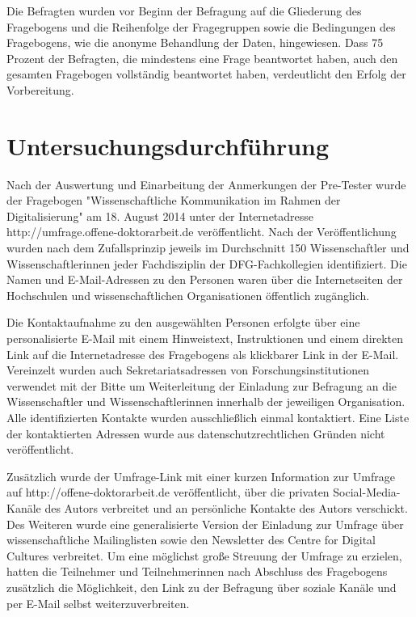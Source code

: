 Die Befragten wurden vor Beginn der Befragung auf die Gliederung des Fragebogens und die Reihenfolge der Fragegruppen sowie die Bedingungen des Fragebogens, wie die anonyme Behandlung der Daten, hingewiesen. Dass 75 Prozent der Befragten, die mindestens eine Frage beantwortet haben, auch den gesamten Fragebogen vollständig beantwortet haben, verdeutlicht den Erfolg der Vorbereitung.

\section{Untersuchungsdurchführung}

Nach der Auswertung und Einarbeitung der Anmerkungen der Pre-Tester wurde der Fragebogen "Wissenschaftliche Kommunikation im Rahmen der Digitalisierung" am 18. August 2014 unter der Internetadresse http://umfrage.offene-doktorarbeit.de veröffentlicht. Nach der Veröffentlichung wurden nach dem Zufallsprinzip jeweils im Durchschnitt 150 Wissenschaftler und Wissenschaftlerinnen jeder Fachdisziplin der DFG-Fachkollegien \cite{DFG_2014} identifiziert. Die Namen und E-Mail-Adressen zu den Personen waren über die Internetseiten der Hochschulen und wissenschaftlichen Organisationen öffentlich zugänglich.

Die Kontaktaufnahme zu den ausgewählten Personen erfolgte über eine personalisierte E-Mail mit einem Hinweistext, Instruktionen und einem direkten Link auf die Internetadresse des Fragebogens als klickbarer Link in der E-Mail. Vereinzelt wurden auch Sekretariatsadressen von Forschungsinstitutionen verwendet mit der Bitte um Weiterleitung der Einladung zur Befragung an die Wissenschaftler und Wissenschaftlerinnen innerhalb der jeweiligen Organisation. Alle identifizierten Kontakte wurden ausschließlich einmal kontaktiert. Eine Liste der kontaktierten Adressen wurde aus datenschutzrechtlichen Gründen nicht veröffentlicht.

Zusätzlich wurde der Umfrage-Link mit einer kurzen Information zur Umfrage auf http://offene-doktorarbeit.de veröffentlicht, über die privaten Social-Media-Kanäle des Autors verbreitet und an persönliche Kontakte des Autors verschickt. Des Weiteren wurde eine generalisierte Version der Einladung zur Umfrage über wissenschaftliche Mailinglisten sowie den Newsletter des Centre for Digital Cultures verbreitet. Um eine möglichst große Streuung der Umfrage zu erzielen, hatten die Teilnehmer und Teilnehmerinnen nach Abschluss des Fragebogens zusätzlich die Möglichkeit, den Link zu der Befragung über soziale Kanäle und per E-Mail selbst weiterzuverbreiten.

